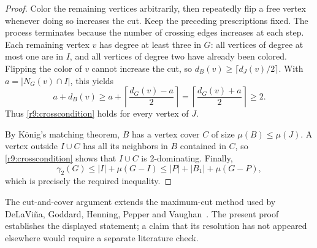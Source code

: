 \documentclass[11pt,a4paper]{article}
\theoremstyle{remark}
\begin{document}
\begin{proof}
Color the remaining vertices arbitrarily, then repeatedly flip a free
vertex whenever doing so increases the cut. Keep the preceding
prescriptions fixed. The process terminates because the number of
crossing edges increases at each step. Each remaining vertex
$v$ has degree at least three in $G$: all vertices of degree at most one
are in $I$, and all vertices of degree two have already been colored.
Flipping the color of $v$ cannot increase the cut, so
$d_B(v)\ge\lceil d_J(v)/2\rceil$. With $a=|N_G(v)\cap I|$, this yields
\[
 a+d_B(v)\ge a+\left\lceil\frac{d_G(v)-a}{2}\right\rceil
 =\left\lceil\frac{d_G(v)+a}{2}\right\rceil\ge2.
\]
Thus \eqref{r9:crosscondition} holds for every vertex of $J$.

By K\"onig's matching theorem, $B$ has a vertex cover $C$ of size
$\mu(B)\le\mu(J)$. A vertex outside $I\cup C$ has all its neighbors in
$B$ contained in $C$, so \eqref{r9:crosscondition} shows that $I\cup C$
is 2-dominating. Finally,
\[
 \gamma_2(G)\le |I|+\mu(G-I)
 \le |P|+|B_1|+\mu(G-P),
\]
which is precisely the required inequality.
\end{proof}
The cut-and-cover argument extends the maximum-cut method used by
DeLaVi\~na, Goddard, Henning, Pepper and Vaughan~\cite{DGHPV11}.
The present proof establishes the displayed statement; a claim that
its resolution has not appeared elsewhere would require a separate
literature check.
\end{document}
